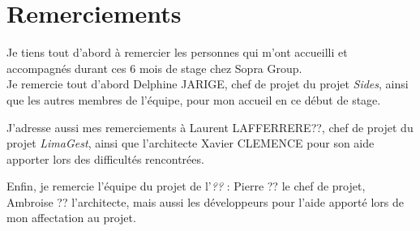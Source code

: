 \cleardoublepage

\chapter*{Remerciements}



Je tiens tout d'abord à remercier les personnes qui m'ont accueilli et accompagnés durant ces 6 mois de stage chez Sopra Group.
\\


Je remercie tout d'abord Delphine JARIGE, chef de projet du projet \textit{Sides}, ainsi que les autres membres de l'équipe, pour mon accueil en ce début de stage.

J'adresse aussi mes remerciements à Laurent LAFFERRERE??, chef de projet du projet \textit{LimaGest}, ainsi que l'architecte Xavier CLEMENCE pour son aide apporter lors des difficultés rencontrées.

Enfin, je remercie l'équipe du projet de l'\textit{??} : Pierre ?? le chef de projet, Ambroise ?? l'architecte, mais aussi les développeurs pour l'aide apporté lors de mon affectation au projet.